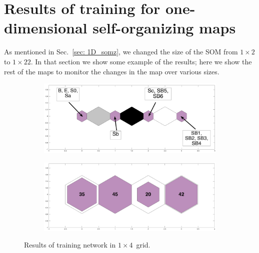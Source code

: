 \newpage
\appendix
\section{Results of training for one-dimensional self-organizing maps}
\label{app: high_Z_1d_soms}
As mentioned in Sec.~\ref{sec: 1D_somz}, we changed the size of the SOM from $1\times2$ to $1\times22$. In that section we show some example of the results; here we show the rest of the maps to monitor the changes in the map over various sizes.

\label{app: 1d}
    \begin{figure}
        \begin{subfigure}[b]{0.5\textwidth}
            \centering
            \includegraphics[width=\textwidth]{../images0.01/1d/apps/dist_1_by_4.png}
        \end{subfigure}
        \hfill
        \begin{subfigure}[b]{0.5\textwidth}
             \includegraphics[width=\textwidth]{../images0.01/1d/apps/hit_v_1_by_4.png}
        \end{subfigure}
                \caption{Results of training network in $1\times4$~grid.}
         \label{fig: 1by4T}
    \end{figure}
    

